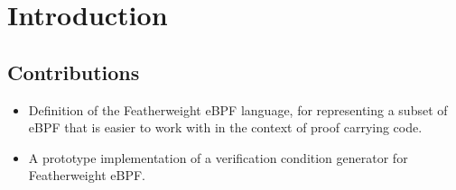 \section{Introduction}
\label{sec:introduction}

\subsection{Contributions}
\label{subsec:contributions}

\begin{itemize}
\item Definition of the Featherweight eBPF language, for representing a subset of eBPF that is easier to work with in the context of proof carrying code.
\item A prototype implementation of a verification condition generator for Featherweight eBPF.
  
\end{itemize}
